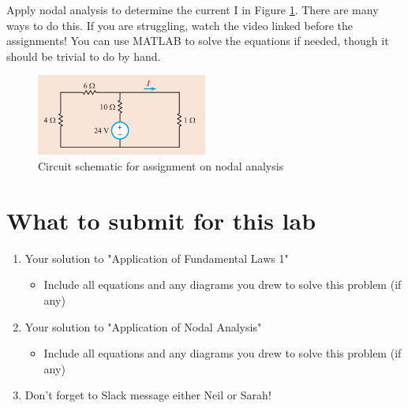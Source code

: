 \documentclass{article}
\begin{document}
Apply nodal analysis to determine the current I in Figure
\ref{fig:nodal_assignment}. There are
many ways to do this. If you are struggling, watch the video linked before the
assignments! You can use MATLAB to solve the equations if needed, though it
should be trivial to do by hand.

\begin{figure}[!htbp]
\centering
\includegraphics[width=0.5\textwidth]{e_3-1}
\caption{Circuit schematic for assignment on nodal analysis}
\label{fig:nodal_assignment}
\end{figure}

\section*{What to submit for this lab}

\begin{enumerate}

  \item Your solution to "Application of Fundamental Laws 1"
    \begin{itemize}
  \item Include all equations and any diagrams you drew to solve this problem (if any)
    \end{itemize}
  \item  Your solution to "Application of Nodal Analysis"
    \begin{itemize}
      \item Include all equations and any diagrams you drew to solve this problem (if any)
    \end{itemize}
  \item Don't forget to Slack message either Neil or Sarah!
\end{enumerate}
\end{document}
